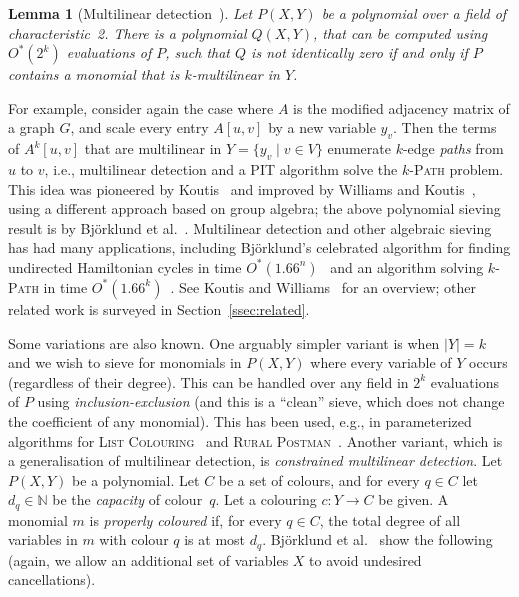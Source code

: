 \documentclass[10pt,a4paper]{article}
\newtheorem{lemma}{Lemma}[section]
\newcommand{\N}{\ensuremath{\mathbb N}\xspace}
\begin{document}
\begin{lemma}[Multilinear detection~\cite{Bjorklund14detsum,BjorklundHKK17narrow}] \label{lemma:multlinear}
  Let $P(X,Y)$ be a polynomial 
  over a field of characteristic~2. There is a polynomial $Q(X,Y)$,
  that can be computed using $O^*(2^k)$ evaluations of $P$, such that $Q$
  is not identically zero if and only if $P$ contains a monomial that
  is $k$-multilinear in $Y$.
\end{lemma}

For example, consider again the case where $A$ is the modified
adjacency matrix of a graph $G$, and scale every entry $A[u,v]$ by
a new variable $y_v$. Then the terms of $A^k[u,v]$ that are
multilinear in $Y=\{y_v \mid v \in V\}$ enumerate $k$-edge
\emph{paths} from $u$ to $v$, i.e., multilinear detection and a PIT
algorithm solve the \textsc{$k$-Path} problem.
This idea was pioneered by Koutis~\cite{Koutis08ICALP} and
improved by Williams and Koutis~\cite{KoutisW09limits,Williams09IPL},
using a different approach based on group algebra; the above
polynomial sieving result is by Björklund et al.~\cite{Bjorklund14detsum,BjorklundHKK17narrow}.
Multilinear detection and other algebraic sieving has had many applications, including Bj\"orklund's
celebrated algorithm for finding undirected Hamiltonian cycles in time
$O^*(1.66^n)$~\cite{Bjorklund14detsum} and an algorithm solving
\textsc{$k$-Path} in time $O^*(1.66^k)$~\cite{BjorklundHKK17narrow}.
See Koutis and Williams~\cite{KoutisW16CACM} for an overview; other
related work is surveyed in Section~\ref{ssec:related}.

Some variations are also known. One arguably simpler variant 
is when $|Y|=k$ and we wish to sieve for monomials in $P(X,Y)$ where
every variable of $Y$ occurs (regardless of their degree).
This can be handled over any field in $2^k$ evaluations of $P$
using \emph{inclusion-exclusion} (and this is a ``clean'' sieve, which
does not change the coefficient of any monomial).
This has been used, e.g., in parameterized algorithms for
\textsc{List Colouring}~\cite{GutinMOW21listcol} and 
\textsc{Rural Postman}~\cite{GutinWY17rpostman}.
Another variant, which is a generalisation of multilinear detection, 
is \emph{constrained multilinear detection}.
Let $P(X,Y)$ be a polynomial. Let $C$ be a set of colours, and for
every $q \in C$ let $d_q \in \N$ be the \emph{capacity} of colour~$q$.
Let a colouring $c \colon Y \to C$ be given.
A monomial $m$ is \emph{properly coloured} if, for every $q \in C$,
the total degree of all variables in $m$ with colour $q$ is at most $d_q$. 
Bj\"orklund et al.~\cite{BjorklundKK16} show the following (again, we
allow an additional set of variables $X$ to avoid undesired
cancellations).
\end{document}
